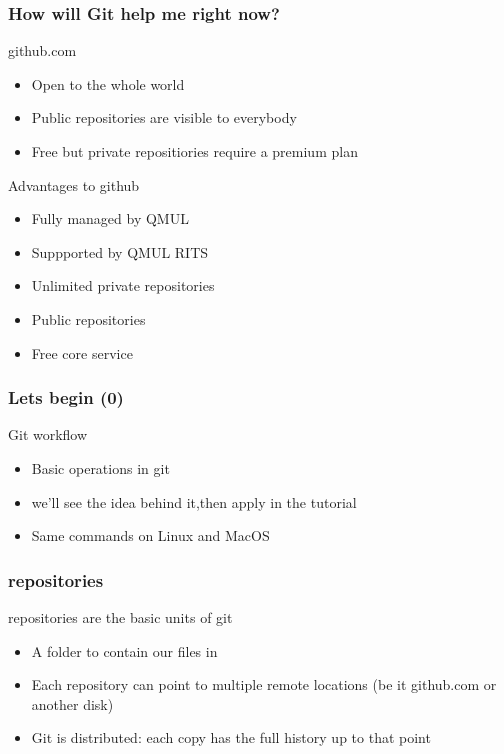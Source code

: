 \documentclass{beamer}
\begin{document}
\begin{frame}
  \frametitle{How will Git help me right now?}

  \begin{block}{github.com}
    \begin{itemize}  
      \item Open to the whole world 
      \item Public repositories are visible to everybody 
      \item Free but private repositiories require a premium plan
    \end{itemize}
  \end{block}

  \begin{block}{Advantages to github}
    \begin{itemize}  
      \item Fully managed by QMUL 
      \item Suppported by QMUL RITS 
      \item Unlimited private repositories 
      \item Public repositories 
      \item Free core service
    \end{itemize}
  \end{block}

\end{frame}


\begin{frame}[fragile]
  \frametitle{Lets begin (0)}

 \begin{block}{Git workflow}
   \begin{itemize}  
      \item Basic operations in git
      \item we'll see the idea behind it,then apply in the tutorial
      \item Same commands on Linux and MacOS
    \end{itemize}
  \end{block}

\end{frame}

\begin{frame}[fragile]
  \frametitle{repositories}

 \begin{block}{repositories are the basic units of git}
   \begin{itemize}  
      \item A folder to contain our files in
      \item Each repository can point to multiple remote locations (be it github.com or another disk)
      \item Git is distributed: each copy has the full history up to that point 
    \end{itemize}
  \end{block}

\end{frame}
\end{document}

